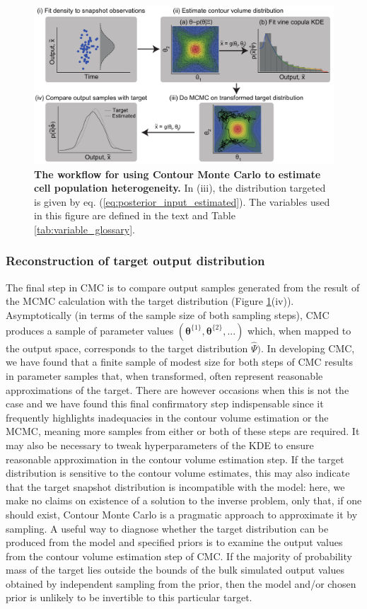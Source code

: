 \begin{figure}[H]
	\centerline{\includegraphics[width=\textwidth]{../figures/workflow.pdf}}
	\caption{\textbf{The workflow for using Contour Monte Carlo to estimate cell population heterogeneity.} In (iii), the distribution targeted is given by eq. (\ref{eq:posterior_input_estimated}). The variables used in this figure are defined in the text and Table \ref{tab:variable_glossary}.}
	\label{fig:workflow}
\end{figure}

\subsubsection{Reconstruction of target output distribution}

The final step in CMC is to compare output samples generated from the result of the MCMC calculation with the target distribution (Figure \ref{fig:workflow}(iv)). Asymptotically (in terms of the sample size of both sampling steps), CMC produces a sample of parameter values $(\boldsymbol{\theta}^{\{1\}},\boldsymbol{\theta}^{\{2\}},...)$ which, when mapped to the output space, corresponds to the target distribution $\hat{\Psi})$. In developing CMC, we have found that a finite sample of modest size for both steps of CMC results in parameter samples that, when transformed, often represent reasonable approximations of the target. There are however occasions when this is not the case and we have found this final confirmatory step indispensable since it frequently highlights inadequacies in the contour volume estimation or the MCMC, meaning more samples from either or both of these steps are required. It may also be necessary to tweak hyperparameters of the KDE to ensure reasonable approximation in the contour volume estimation step. If the target distribution is sensitive to the contour volume estimates, this may also indicate that the target snapshot distribution is incompatible with the model: here, we make no claims on existence of a solution to the inverse problem, only that, if one should exist, Contour Monte Carlo is a pragmatic approach to approximate it by sampling. A useful way to diagnose whether the target distribution can be produced from the model and specified priors is to examine the output values from the contour volume estimation step of CMC. If the majority of probability mass of the target lies outside the bounds of the bulk simulated output values obtained by independent sampling from the prior, then the model and/or chosen prior is unlikely to be invertible to this particular target.

